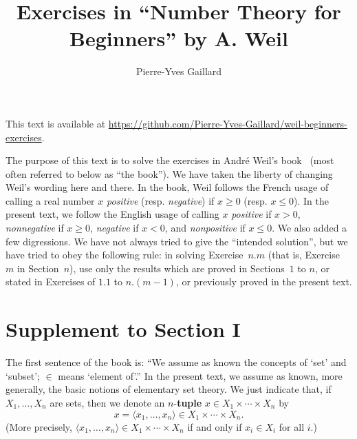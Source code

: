 \documentclass[12pt,letterpaper]{article}
\title{Exercises in ``Number Theory for Beginners'' by A. Weil}
\author{Pierre-Yves Gaillard}
\date{}
\theoremstyle{definition}
\begin{document}

\maketitle 


\begin{center}
{\scriptsize This text is available at \url{https://github.com/Pierre-Yves-Gaillard/weil-beginners-exercises}.}
\end{center}

\tableofcontents\bigskip


The purpose of this text is to solve the exercises in André Weil's book~\cite{weil1979} (most often referred to below as ``the book''). We have taken the liberty of changing Weil's wording here and there. In the book, Weil follows the French usage of calling a real number $x$ \emph{positive} (resp. \emph{negative}) if $x\ge0$ (resp. $x\le0$). In the present text, we follow the English usage of calling $x$ \emph{positive} if $x>0$, \emph{nonnegative} if $x\ge0$, \emph{negative} if $x<0$, and \emph{nonpositive} if $x\le0$. We also added a few digressions. We have not always tried to give the ``intended solution'', but we have tried to obey the following rule: in solving Exercise~$n.m$ (that is, Exercise~$m$ in Section~$n$), use only the results which are proved in Sections~$1$ to $n$, or stated in Exercises of $1.1$ to $n.(m-1)$, or previously proved in the present text. 

\section{Supplement to Section I}\label{SsI} %

The first sentence of the book is: ``We assume as known the concepts of `set' and `subset'; $\in$ means `element of'.'' In the present text, we assume as known, more generally, the basic notions of elementary set theory. We just indicate that, if $X_1, \ldots,X_n$ are sets, then we denote an $n$-\textbf{tuple}  $x\in X_1\times\cdots\times X_n$ by 
\begin{equation}\label{Eqtuple}
x=\langle x_1, \ldots,x_n\rangle\in X_1\times\cdots\times X_n. 
\end{equation} 
(More precisely, $\langle x_1, \ldots,x_n\rangle\in X_1\times\cdots\times X_n$ if and only if $x_i\in X_i$ for all $i$.) 
\end{document}
